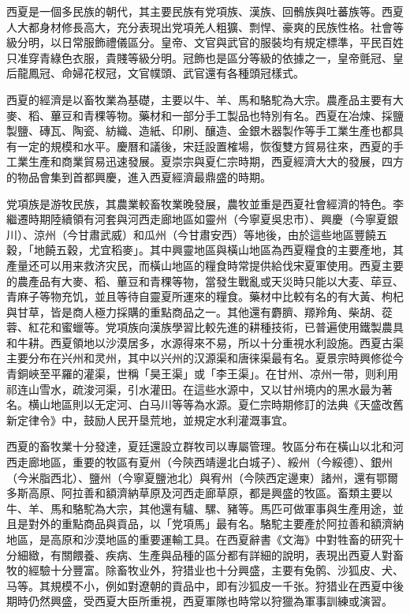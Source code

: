 西夏是一個多民族的朝代，其主要民族有党項族、漢族、回鶻族與吐蕃族等。西夏人大都身材修長高大，充分表現出党項羌人粗獷、剽悍、豪爽的民族性格。社會等級分明，以日常服飾禮儀區分。皇帝、文官與武官的服裝均有規定標準，平民百姓只准穿青綠色衣服，貴賤等級分明。冠飾也是區分等級的依據之一，皇帝氈冠、皇后龍鳳冠、命婦花杈冠，文官幞頭、武官還有各種頭冠樣式。

西夏的經濟是以畜牧業為基礎，主要以牛、羊、馬和駱駝為大宗。農產品主要有大麥、稻、蓽豆和青稞等物。藥材和一部分手工製品也特別有名。西夏在冶煉、採鹽製鹽、磚瓦、陶瓷、紡織、造紙、印刷、釀造、金銀木器製作等手工業生產也都具有一定的規模和水平。慶曆和議後，宋廷設置榷場，恢復雙方貿易往來，西夏的手工業生產和商業貿易迅速發展。夏崇宗與夏仁宗時期，西夏經濟大大的發展，四方的物品會集到首都興慶，進入西夏經濟最鼎盛的時期。

党項族是游牧民族，其農業較畜牧業晚發展，農牧並重是西夏社會經濟的特色。李繼遷時期陸續領有河套與河西走廊地區如靈州（今寧夏吳忠市）、興慶（今寧夏銀川）、涼州（今甘肅武威）和瓜州（今甘肅安西）等地後，由於這些地區豐饒五穀，「地饒五穀，尤宜稻麥」。其中興靈地區與橫山地區為西夏糧食的主要產地，其產量还可以用来救济灾民，而橫山地區的糧食時常提供給伐宋夏軍使用。西夏主要的農產品有大麥、稻、蓽豆和青稞等物，當發生戰亂或天災時只能以大麦、荜豆、青麻子等物充饥，並且等待自靈夏所運來的糧食。藥材中比較有名的有大黃、枸杞與甘草，皆是商人極力採購的重點商品之一。其他還有麝臍、羱羚角、柴胡、蓯蓉、紅花和蜜蠟等。党項族向漢族學習比較先進的耕種技術，已普遍使用鐵製農具和牛耕。西夏領地以沙漠居多，水源得來不易，所以十分重視水利設施。西夏古渠主要分布在兴州和灵州，其中以兴州的汉源渠和唐徕渠最有名。夏景宗時興修從今青銅峽至平羅的灌渠，世稱「昊王渠」或「李王渠」。在甘州、凉州一带，则利用祁连山雪水，疏浚河渠，引水灌田。在這些水源中，又以甘州境内的黑水最为著名。横山地區則以无定河、白马川等等為水源。夏仁宗時期修訂的法典《天盛改舊新定律令》中，鼓励人民开垦荒地，並規定水利灌溉事宜。

西夏的畜牧業十分發達，夏廷還設立群牧司以專屬管理。牧區分布在橫山以北和河西走廊地區，重要的牧區有夏州（今陝西靖邊北白城子）、綏州（今綏德）、銀州（今米脂西北）、鹽州（今寧夏鹽池北）與宥州（今陝西定邊東）諸州，還有鄂爾多斯高原、阿拉善和額濟納草原及河西走廊草原，都是興盛的牧區。畜類主要以牛、羊、馬和駱駝為大宗，其他還有驢、騾、豬等。馬匹可做軍事與生產用途，並且是對外的重點商品與貢品，以「党項馬」最有名。駱駝主要產於阿拉善和額濟納地區，是高原和沙漠地區的重要運輸工具。在西夏辭書《文海》中對牲畜的研究十分細緻，有關餵養、疾病、生產與品種的區分都有詳細的說明，表現出西夏人對畜牧的經驗十分豐富。除畜牧业外，狩猎业也十分興盛，主要有兔鹘、沙狐皮、犬、马等。其規模不小，例如對遼朝的貢品中，即有沙狐皮一千张。狩猎业在西夏中後期時仍然興盛，受西夏大臣所重視，西夏軍隊也時常以狩獵為軍事訓練或演習。

